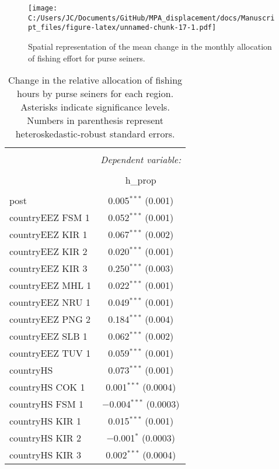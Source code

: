 \documentclass[11pt,]{article}
\begin{document}
\begin{figure}
\centering
\texttt{[image: C:/Users/JC/Documents/GitHub/MPA\_displacement/docs/Manuscript\_files/figure-latex/unnamed-chunk-17-1.pdf]}
\caption{\label{fig:unnamed-chunk-17}\label{fig:map_change_ps}Spatial
representation of the mean change in the monthly allocation of fishing
effort for purse seiners.}
\end{figure}

\begin{table}[!htbp] \centering 
  \caption{\label{tab:disp_mod}Change in the relative allocation of fishing hours by purse seiners for each region. Asterisks indicate significance levels. Numbers in parenthesis represent heteroskedastic-robust standard errors.} 
  \label{} 
\begin{tabular}{@{\extracolsep{5pt}}lc} 
\\[-1.8ex]\hline 
\hline \\[-1.8ex] 
 & \multicolumn{1}{c}{\textit{Dependent variable:}} \\ 
\cline{2-2} 
\\[-1.8ex] & h\_prop \\ 
\hline \\[-1.8ex] 
 post & 0.005$^{***}$ (0.001) \\ 
  countryEEZ FSM 1 & 0.052$^{***}$ (0.001) \\ 
  countryEEZ KIR 1 & 0.067$^{***}$ (0.002) \\ 
  countryEEZ KIR 2 & 0.020$^{***}$ (0.001) \\ 
  countryEEZ KIR 3 & 0.250$^{***}$ (0.003) \\ 
  countryEEZ MHL 1 & 0.022$^{***}$ (0.001) \\ 
  countryEEZ NRU 1 & 0.049$^{***}$ (0.001) \\ 
  countryEEZ PNG 2 & 0.184$^{***}$ (0.004) \\ 
  countryEEZ SLB 1 & 0.062$^{***}$ (0.002) \\ 
  countryEEZ TUV 1 & 0.059$^{***}$ (0.001) \\ 
  countryHS & 0.073$^{***}$ (0.001) \\ 
  countryHS COK 1 & 0.001$^{***}$ (0.0004) \\ 
  countryHS FSM 1 & $-$0.004$^{***}$ (0.0003) \\ 
  countryHS KIR 1 & 0.015$^{***}$ (0.001) \\ 
  countryHS KIR 2 & $-$0.001$^{*}$ (0.0003) \\ 
  countryHS KIR 3 & 0.002$^{***}$ (0.0004) \\ 

\end{tabular}
\end{table}
\end{document}
